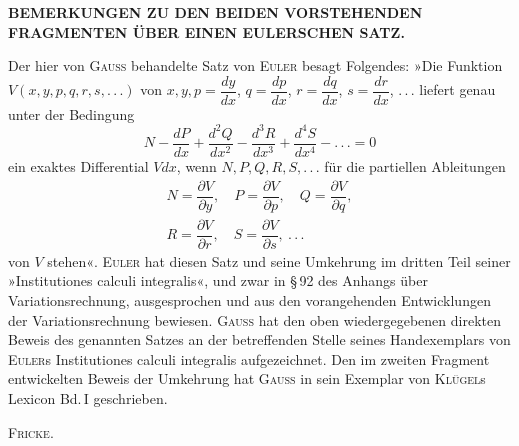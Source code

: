 \begin{center}
\textbf{BEMERKUNGEN ZU DEN BEIDEN VORSTEHENDEN FRAGMENTEN ÜBER EINEN EULERSCHEN SATZ.}
\end{center}

\noindent\hspace*{\parindent}Der hier von \textsc{Gauss} behandelte Satz von \textsc{Euler} besagt Folgendes: »Die Funktion
$V(x, y, p, q, r, s, .\,.\,.)$ von $x, y, p=\dfrac{dy}{dx}$, $q=\dfrac{dp}{dx}$, $r=\dfrac{dq}{dx}$, $s=\dfrac{dr}{dx}$, $.\,.\,.$
liefert genau unter der Bedingung
\[
N-\dfrac{dP}{dx}+\dfrac{d^2Q}{dx^2}-\dfrac{d^3R}{dx^3}+\dfrac{d^4S}{dx^4}-.\,.\,.=0
\]
ein exaktes Differential $Vdx$, wenn $N, P, Q, R, S, .\,.\,.$ für die partiellen Ableitungen
\[
\begin{aligned}N=\dfrac{\partial V}{\partial y},\quad P=\dfrac{\partial V}{\partial p},\quad Q=\dfrac{\partial V}{\partial q},\\ R=\dfrac{\partial V}{\partial r},\quad S=\dfrac{\partial V}{\partial s},\ .\,.\,.
\end{aligned}
\]
von $V$ stehen«. \textsc{Euler} hat diesen Satz und seine Umkehrung im dritten Teil
seiner »Institutiones calculi integralis«, und zwar in \S\,92 des Anhangs über Variationsrechnung,
ausgesprochen und aus den vorangehenden Entwicklungen der Variationsrechnung bewiesen.
\textsc{Gauss} hat den oben wiedergegebenen direkten Beweis des genannten Satzes an der betreffenden
Stelle seines Handexemplars von \textsc{Euler}s Institutiones calculi integralis aufgezeichnet.
Den im zweiten Fragment entwickelten Beweis der Umkehrung hat \textsc{Gauss} in sein
Exemplar von \textsc{Klügel}s Lexicon Bd.\,I geschrieben.

\begin{flushright}
\textsc{Fricke}.
\end{flushright}

